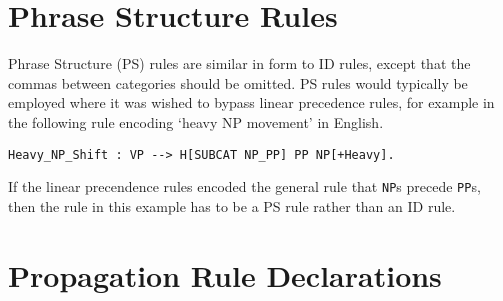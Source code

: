\section{Phrase Structure Rules}

Phrase Structure (PS) rules are similar in form to ID rules, except that
the commas between categories should be omitted. 
PS rules would typically be employed where it was wished to bypass linear
precedence rules, for example in the following rule encoding `heavy NP
movement' in English.
\begin{ex}
\begin{verbatim}
Heavy_NP_Shift : VP --> H[SUBCAT NP_PP] PP NP[+Heavy].
\end{verbatim}
\end{ex}
If the linear precendence rules encoded the general rule that {\tt NP}s
precede {\tt PP}s, then the rule in this example has to
be a PS rule rather than an ID rule.
 
\section{Propagation Rule Declarations}

